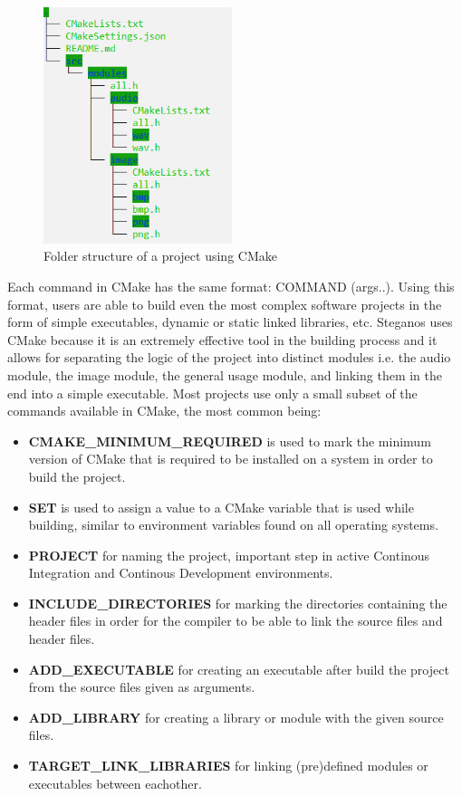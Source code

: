 \begin{multicols}{2}
\begin{figure}[H]
    \centering
    \includegraphics[height=6.9cm,keepaspectratio]{pics/cmake_folder_structure_example}
    \caption{Folder structure of a project using CMake}
\end{figure}

Each command in CMake has the same format: COMMAND (args..). Using this format, users are able to build even the most complex software projects in the form of simple executables, dynamic or static linked libraries, etc. Steganos uses CMake because it is an extremely effective tool in the building process and it allows for separating the logic of the project into distinct modules i.e. the audio module, the image module, the general usage module, and linking them in the end into a simple executable. Most projects use only a small subset of the commands available in CMake, the most common being:

\begin{itemize}
  \item \textbf{CMAKE\_MINIMUM\_REQUIRED} is used to mark the minimum version of CMake that is required to be installed on a system in order to build the project.
  \item \textbf{SET} is used to assign a value to a CMake variable that is used while building, similar to environment variables found on all operating systems.
  \item \textbf{PROJECT} for naming the project, important step in active Continous Integration and Continous Development environments.
  \item \textbf{INCLUDE\_DIRECTORIES} for marking the directories containing the header files in order for the compiler to be able to link the source files and header files.
  \item \textbf{ADD\_EXECUTABLE} for creating an executable after build the project from the source files given as arguments.
  \item \textbf{ADD\_LIBRARY} for creating a library or module with the given source files.
  \item \textbf{TARGET\_LINK\_LIBRARIES} for linking (pre)defined modules or executables between eachother.
\end{itemize}



\end{multicols}
